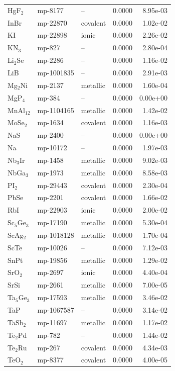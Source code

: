 \begin{longtable}{@{}l l l r r@{}}
HgF$_{2}$ & mp-8177 & -- & 0.0000 & 8.95e-03 \\
InBr & mp-22870 & covalent & 0.0000 & 1.02e-02 \\
KI & mp-22898 & ionic & 0.0000 & 2.26e-02 \\
KN$_{3}$ & mp-827 & -- & 0.0000 & 2.80e-04 \\
Li$_{2}$Se & mp-2286 & -- & 0.0000 & 1.16e-02 \\
LiB & mp-1001835 & -- & 0.0000 & 2.91e-03 \\
Mg$_{2}$Ni & mp-2137 & metallic & 0.0000 & 1.60e-04 \\
MgP$_{4}$ & mp-384 & -- & 0.0000 & 0.00e+00 \\
MnAl$_{12}$ & mp-1104165 & metallic & 0.0000 & 1.42e-02 \\
MoSe$_{2}$ & mp-1634 & covalent & 0.0000 & 1.16e-03 \\
NaS & mp-2400 & -- & 0.0000 & 0.00e+00 \\
Na & mp-10172 & -- & 0.0000 & 1.97e-03 \\
Nb$_{3}$Ir & mp-1458 & metallic & 0.0000 & 9.02e-03 \\
NbGa$_{3}$ & mp-1973 & metallic & 0.0000 & 8.58e-03 \\
PI$_{2}$ & mp-29443 & covalent & 0.0000 & 2.30e-04 \\
PbSe & mp-2201 & covalent & 0.0000 & 1.66e-02 \\
RbI & mp-22903 & ionic & 0.0000 & 2.00e-02 \\
Sc$_{5}$Ge$_{3}$ & mp-17190 & metallic & 0.0000 & 5.30e-04 \\
ScAg$_{2}$ & mp-1018128 & metallic & 0.0000 & 1.70e-04 \\
ScTe & mp-10026 & -- & 0.0000 & 7.12e-03 \\
SnPt & mp-19856 & metallic & 0.0000 & 1.29e-02 \\
SrO$_{2}$ & mp-2697 & ionic & 0.0000 & 4.40e-04 \\
SrSi & mp-2661 & metallic & 0.0000 & 7.00e-05 \\
Ta$_{5}$Ge$_{3}$ & mp-17593 & metallic & 0.0000 & 3.46e-02 \\
TaP & mp-1067587 & -- & 0.0000 & 3.14e-02 \\
TaSb$_{2}$ & mp-11697 & metallic & 0.0000 & 1.17e-02 \\
Te$_{2}$Pd & mp-782 & -- & 0.0000 & 1.44e-02 \\
Te$_{2}$Ru & mp-267 & covalent & 0.0000 & 4.34e-03 \\
TeO$_{2}$ & mp-8377 & covalent & 0.0000 & 4.00e-05 \\

\end{longtable}
